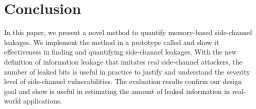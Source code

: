 \section{Conclusion}
In this paper, we present a novel  %
method to
quantify memory-based side-channel leakages. We implement the method in
a prototype called \tool{} and show it effectiveness in finding
and quantifying side-channel leakages. With the new definition of
information leakage that imitates real side-channel attackers, the number of
leaked bits is useful in practice to justify and understand the severity level
of side-channel vulnerabilities. The evaluation results confirm our design goal
and show \tool{} is useful in estimating the amount of leaked information in
real-world applications.
